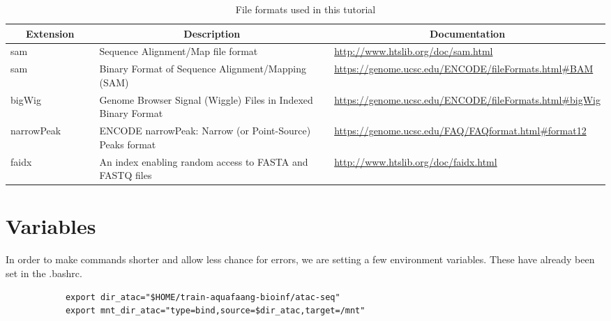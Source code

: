 \documentclass[12pt]{article}
\begin{document}
		\begin{table}[H]
			\begin{center}
				\begin{adjustbox}{width=1\textwidth}
					\begin{tabular}{p{0.15\linewidth} | p{0.4\linewidth} | p{0.5\linewidth}}

						\multicolumn{1}{c}{ \textbf{Extension}} & \multicolumn{1}{c}{\textbf{Description}} & \multicolumn{1}{c}{\textbf{Documentation}} \\
						\hline
						sam & Sequence Alignment/Map file format &\url{http://www.htslib.org/doc/sam.html} \\
						\hline
						sam & Binary Format of Sequence Alignment/Mapping (SAM) & \url{https://genome.ucsc.edu/ENCODE/fileFormats.html#BAM}\\
						\hline
						bigWig & Genome Browser Signal (Wiggle) Files in Indexed Binary Format & \url{https://genome.ucsc.edu/ENCODE/fileFormats.html#bigWig}\\
						\hline
						narrowPeak & ENCODE narrowPeak: Narrow (or Point-Source) Peaks format& \url{https://genome.ucsc.edu/FAQ/FAQformat.html#format12}  \\
						\hline
						faidx & An index enabling random access to FASTA and FASTQ files & \url{http://www.htslib.org/doc/faidx.html} \\
						\hline 
					\end{tabular}
				\end{adjustbox}
				\caption[FileFormats]{File formats used in this tutorial }
				\label{table:genrich}
			\end{center}
		\end{table}
	

	
	\section{Variables}
	In order to make commands shorter and allow less chance for errors, we are setting a few  environment variables. These have already been set in the .bashrc.
	
	\vspace{0.5cm}	
	\begin{minipage}{\linewidth}
		\begin{lstlisting}
			export dir_atac="$HOME/train-aquafaang-bioinf/atac-seq"
			export mnt_dir_atac="type=bind,source=$dir_atac,target=/mnt"
		\end{lstlisting}
	\end{minipage}
\end{document}
